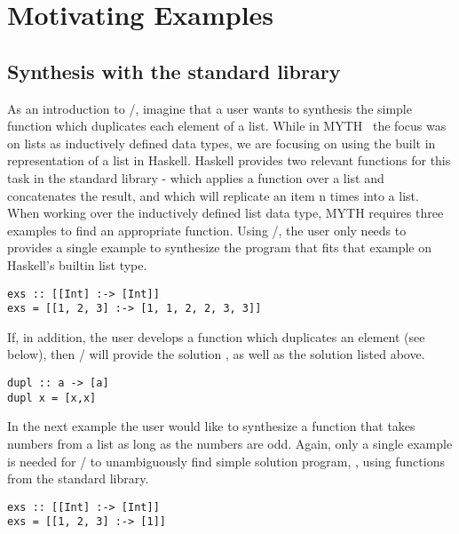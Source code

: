 \section{Motivating Examples} 
\label{examples}

\subsection{Synthesis with the standard library}

As an introduction to \ourTool/, imagine that a user wants to synthesis the simple  \cite{Osera:2015} function which duplicates each element of a list.
While in MYTH~\cite{Osera:2015} the focus was on lists as inductively defined data types, we are focusing on using the built in representation of a list in Haskell.
Haskell provides two relevant functions for this task in the standard library -  which applies a function over a list and concatenates the result, and  which will replicate an item n times into a list.
When working over the inductively defined list data type, MYTH requires three examples to find an appropriate function. Using \ourTool/, the user only needs to provides a single example to synthesize the program  that fits that example on Haskell's builtin list type.

\begin{lstlisting}
exs :: [[Int] :-> [Int]]
exs = [[1, 2, 3] :-> [1, 1, 2, 2, 3, 3]]
\end{lstlisting}

If, in addition, the user develops a function  which duplicates an element (see below), then \ourTool/ will provide the solution , as well as the solution listed above.

\begin{lstlisting}
dupl :: a -> [a]
dupl x = [x,x]
\end{lstlisting}

In the next example the user would like to synthesize a function that takes numbers from a list as long as the numbers are odd.
Again, only a single example is needed for \ourTool/ to unambiguously find  simple solution program, , using functions from the standard library. 

\begin{lstlisting}
exs :: [[Int] :-> [Int]]
exs = [[1, 2, 3] :-> [1]]
\end{lstlisting}

